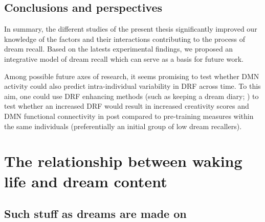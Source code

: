 \section{Conclusions and perspectives}
\label{disc:drf:perspectives}

In summary, the different studies of the present thesis significantly improved our knowledge of the factors and their interactions contributing to the process of dream recall. Based on the latests experimental findings, we proposed an integrative model of dream recall which can serve as a basis for future work.

Among possible future axes of research, it seems promising to test whether DMN activity could also predict intra-individual variability in DRF across time. To this aim, one could use DRF enhancing methods (such as keeping a dream diary; \citealp{schredl_questionnaires_2002}) to test whether an increased DRF would result in increased creativity scores and DMN functional connectivity in post compared to pre-training measures within the same individuals (preferentially an initial group of low dream recallers).

\cleardoublepage
\chapter{The relationship between waking life and dream content}
\label{disc:wle}

\section{Such stuff as dreams are made on}
\label{disc:drf:summary:residue}


